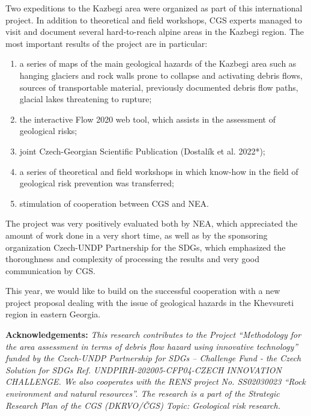 {Two expeditions to the Kazbegi area were organized as part of this international project. In addition to theoretical and field workshops, CGS experts managed to visit and document several hard-to-reach alpine areas in the Kazbegi region. The most important results of the project are in particular:
\begin{enumerate}
\item  a series of maps of the main geological hazards of the Kazbegi area such as hanging glaciers and rock walls prone to collapse and activating debris flows, sources of transportable material, previously documented debris flow paths, glacial lakes threatening to rupture;
\item the interactive Flow 2020 web tool, which assists in the assessment of geological risks;
\item joint Czech-Georgian Scientific Publication (Dostalík et al. 2022*);
\item a series of theoretical and field workshops in which know-how in the field of geological risk prevention was transferred;
\item stimulation of cooperation between CGS and NEA.
\end{enumerate}	

The project was very positively evaluated both by NEA, which appreciated the amount of work done in a very short time, as well as by the sponsoring organization Czech-UNDP Partnership for the SDGs, which emphasized the thoroughness and complexity of processing the results and very good communication by CGS. 

This year, we would like to build on the successful cooperation with a new project proposal dealing with the issue of geological hazards in the Khevsureti region in eastern Georgia.


\vspace{0.5em}
\noindent
\textbf{Acknowledgements:}
\textit{This research contributes to the Project \enquote{Methodology for the area assessment in terms of debris flow hazard using innovative technology} funded by the Czech-UNDP Partnership for SDGs – Challenge Fund - the Czech Solution for SDGs Ref. UNDPIRH-202005-CFP04-CZECH INNOVATION CHALLENGE. 
We also cooperates with the RENS project No. SS02030023 \enquote{Rock environment and natural resources}.
The research is a part of the Strategic Research Plan of the CGS (DKRVO/ČGS) Topic: Geological risk research.}
}
